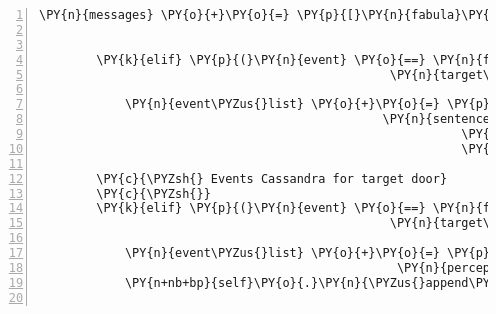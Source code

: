 \begin{Verbatim}[commandchars=\\\{\},numbers=left,firstnumber=1,stepnumber=1]
                \PY{n}{messages} \PY{o}{+}\PY{o}{=} \PY{p}{[}\PY{n}{fabula}\PY{o}{.}\PY{n}{Message}\PY{p}{(}\PY{p}{[}\PY{n}{fabula}\PY{o}{.}\PY{n}{PerceptionEvent}\PY{p}{(}\PY{n}{identifier}\PY{o}{=}\PY{n}{ID\PYZus{}CASSANDRA}\PY{p}{,}
                                                                    \PY{n}{perception}\PY{o}{=}\PY{l+s}{\PYZsq{}}\PY{l+s}{Die Spinne verbirgt etwas!}\PY{l+s}{\PYZsq{}}\PY{p}{)}\PY{p}{]}\PY{p}{)}\PY{p}{]}

        \PY{k}{elif} \PY{p}{(}\PY{n}{event} \PY{o}{==} \PY{n}{fabula}\PY{o}{.}\PY{n}{TriesToTalkToEvent}\PY{p}{(}\PY{n}{identifier}\PY{o}{=}\PY{n}{ID\PYZus{}CASSANDRA}\PY{p}{,}
                                                 \PY{n}{target\PYZus{}identifier}\PY{o}{=}\PY{l+s}{\PYZsq{}}\PY{l+s}{spider}\PY{l+s}{\PYZsq{}}\PY{p}{)}\PY{p}{)}\PY{p}{:}

            \PY{n}{event\PYZus{}list} \PY{o}{+}\PY{o}{=} \PY{p}{[}\PY{n}{fabula}\PY{o}{.}\PY{n}{CanSpeakEvent}\PY{p}{(}\PY{n}{identifier}\PY{o}{=}\PY{n}{ID\PYZus{}CASSANDRA}\PY{p}{,}
                                                \PY{n}{sentences}\PY{o}{=}\PY{p}{[}\PY{l+s}{\PYZsq{}}\PY{l+s}{Entschuldigung, könntest du mal einen Schritt zur Seite gehen?}\PY{l+s}{\PYZsq{}}\PY{p}{,}
                                                           \PY{l+s}{\PYZsq{}}\PY{l+s}{Könntest du mich bitte mal vorbei lassen?}\PY{l+s}{\PYZsq{}}\PY{p}{,}
                                                           \PY{l+s}{\PYZsq{}}\PY{l+s}{Würde es dir etwas ausmachen, mich mal kurz durch zu lassen?}\PY{l+s}{\PYZsq{}}\PY{p}{]}\PY{p}{)}\PY{p}{]}

        \PY{c}{\PYZsh{} Events Cassandra for target door}
        \PY{c}{\PYZsh{}}
        \PY{k}{elif} \PY{p}{(}\PY{n}{event} \PY{o}{==} \PY{n}{fabula}\PY{o}{.}\PY{n}{TriesToLookAtEvent}\PY{p}{(}\PY{n}{identifier}\PY{o}{=}\PY{n}{ID\PYZus{}CASSANDRA}\PY{p}{,}
                                                 \PY{n}{target\PYZus{}identifier}\PY{o}{=}\PY{l+s}{\PYZsq{}}\PY{l+s}{door}\PY{l+s}{\PYZsq{}}\PY{p}{)}\PY{p}{)}\PY{p}{:}

            \PY{n}{event\PYZus{}list} \PY{o}{+}\PY{o}{=} \PY{p}{[}\PY{n}{fabula}\PY{o}{.}\PY{n}{PerceptionEvent}\PY{p}{(}\PY{n}{identifier}\PY{o}{=}\PY{n}{ID\PYZus{}CASSANDRA}\PY{p}{,}
                                                  \PY{n}{perception}\PY{o}{=}\PY{l+s}{\PYZsq{}}\PY{l+s}{Eine kleine Tür, mit einem altem goldenen Schloss!}\PY{l+s}{\PYZsq{}}\PY{p}{)}\PY{p}{]}
            \PY{n+nb+bp}{self}\PY{o}{.}\PY{n}{\PYZus{}append\PYZus{}sentence}\PY{p}{(}\PY{n}{ID\PYZus{}CASSANDRA}\PY{p}{,} \PY{l+s}{\PYZsq{}}\PY{l+s}{Ich glaube, ich hab den Eingang zum Gnomenweg gefunden.}\PY{l+s}{\PYZsq{}}\PY{p}{)}


\end{Verbatim}
